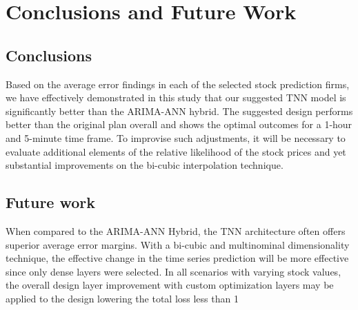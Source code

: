 \chapter{Conclusions and Future Work}
\label{ch:con}
\section{Conclusions}
Based on the average error findings in each of the selected stock prediction firms, we have effectively demonstrated in this study that our suggested TNN model is significantly better than the ARIMA-ANN hybrid. The suggested design performs better than the original plan overall and shows the optimal outcomes for a 1-hour and 5-minute time frame. To improvise such adjustments, it will be necessary to evaluate additional elements of the relative likelihood of the stock prices and yet substantial improvements on the bi-cubic interpolation technique.


\section{Future work}
When compared to the ARIMA-ANN Hybrid, the TNN architecture often offers superior average error margins. With a bi-cubic and multinominal dimensionality technique, the effective change in the time series prediction will be more effective since only dense layers were selected. In all scenarios with varying stock values, the overall design layer improvement with custom optimization layers may be applied to the design lowering the total loss less than 1%
